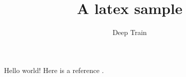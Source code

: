 \documentclass[12pt,a4paper]{article}
\begin{document}
\title{A latex sample}
\author{Deep Train}

\maketitle

Hello world! Here is a reference \cite{lecun2015deep}.


\end{document}
